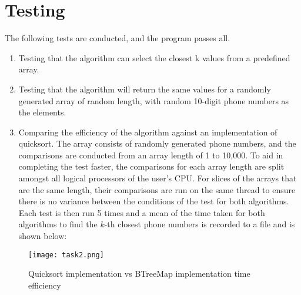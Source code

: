 \documentclass{report}
\begin{document}
\section{Testing}
The following tests are conducted, and the program passes all.
\begin{enumerate}
	\item Testing that the algorithm can select the closest k values from a predefined array.
	\item Testing that the algorithm will return the same values for a randomly generated array of random length, with random 10-digit phone numbers as the elements.
	\item Comparing the efficiency of the algorithm against an implementation of quicksort. The array consists of randomly generated phone numbers, and the comparisons are conducted from an array length of 1 to 10,000. To aid in completing the test faster, the comparisons for each array length are split amongst all logical processors of the user's CPU. For slices of the arrays that are the same length, their comparisons are run on the same thread to ensure there is no variance between the conditions of the test for both algorithms. Each test is then run 5 times and a mean of the time taken for both algorithms to find the \(k\)-th closest phone numbers is recorded to a file and is shown below:
\end{enumerate}
\begin{figure}[H]
	\centering
	\texttt{[image: task2.png]}
	\caption{Quicksort implementation vs BTreeMap implementation time efficiency}
	\label{fig:task2_time_eff}
\end{figure}

\renewcommand{\chaptername}{}
\setcounter{biburlnumpenalty}{9000}
\printbibliography[heading=bibnumbered]
\end{document}

